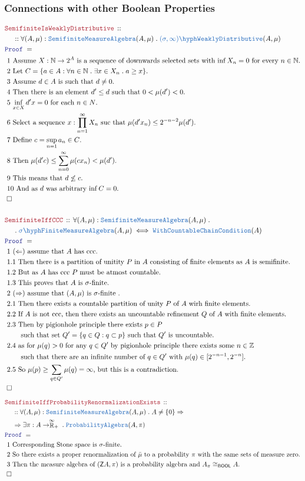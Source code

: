 \documentclass[12pt]{scrartcl}
\newcommand{\TYPE}[1]{\textcolor{NavyBlue}{\mathtt{#1}}}
\newcommand{\LOGIC}[1]{\textcolor{Blue}{\mathtt{#1}}}
\newcommand{\THM}[1]{\textcolor{Maroon}{\mathtt{#1}}}
\renewcommand{\.}{\; . \;}
\newcommand{\Theorem}[2]{& \THM{#1} \, :: \, #2 \\ & \Proof = \\ }
\newcommand{\NewLine}{\\ & \kern 1pc}
\newcommand{\Page}[1]{ \begin{align*} #1 \end{align*}   }
\newcommand{\Imply}{\Rightarrow}
\newcommand{\Int}{\mathbb{Z} }
\newcommand{\Nat}{\mathbb{N} }
\newcommand{\EReals}{\stackrel{\mathclap{\infty}}{\mathbb{R}}}
\newcommand{\QED}{\; \square}
\newcommand{\EndProof}{& \QED \\}
\newcommand{\Proof}{\LOGIC{Proof} \; }
\newcommand{\Explain}[1]{& \text{#1.} \\}
\newcommand{\ExplainFurther}[1]{& \text{#1} \\}
\newcommand{\CCC}{\TYPE{WithCountableChainCondition}}
\newcommand{\WD}{\TYPE{(\sigma,\infty)\hyph WeaklyDistributive}}
\newcommand{\BOOL}{\mathsf{BOOL}}
\newcommand{\Z}{\mathsf{Z}}
\newcommand{\sFinite}{\TYPE{\sigma \hyph  Finite}}
\newcommand{\Semifinite}{\TYPE{Semifinite}}
\newcommand{\MA}{\TYPE{MeasureAlgebra}}
\begin{document}
\subsubsection{Connections with other Boolean Properties}
\Page{
	\Theorem{SemifiniteIsWeaklyDistributive}
	{
		\NewLine ::	
		\forall (A,\mu) : \Semifinite\MA(A,\mu) \. 
		\WD(A,\mu)
	}
	\Explain{ 1 Assume 
		$X : \Nat \to 2^A$ is a sequence of downwards selected sets with 
		$\inf X_n =  0$ for every $n \in \Nat$}
	\Explain{ 2 Let $C = \{ a \in A : \forall n \in \Nat \. \exists  x \in X_n \. a \ge x \}$}
	\Explain{ 3 Assume $d \in A$ is such that $d \neq 0$}
	\Explain{ 4 Then there is an element $d' \le d$ such that $0 < \mu(d') < 0$}
	\Explain{ 5 $\inf_{x \in X} d'x = 0$ for each $n \in N$}
	\Explain{ 6 Select a sequence $x : \prod^\infty_{n=1} X_n$ suc that 
		$\mu(d'x_n) \le 2^{-n-2} \mu(d')$}
	\Explain{ 7 Define $c = \sup_{n=1} a_n \in C$}
	\Explain{ 8 Then $\mu(d'c) \le \sum^\infty_{n=0} \mu(c x_n) < \mu(d')$} 
	\Explain{ 9 This means that $d \not \le c$}
	\Explain{ 10 And as $d$  was arbitrary $\inf C = 0$}
	\EndProof
	\\
	\Theorem{SemifiniteIffCCC}
	{
		\forall (A,\mu ) : \Semifinite\MA(A,\mu) \. \NewLine \.
		\sFinite\MA(A,\mu) \iff \CCC(A)
	}
	\Explain{ 1 $(\Leftarrow)$ assume that $A$ has ccc}
	\Explain{ 1.1 Then there is a partition of unitity $P$ in $A$ consisting of finite elements 
		as $A$ is semifinite}
	\Explain{ 1.2 But as $A$ has ccc $P$ must be atmost countable}
	\Explain{ 1.3 This proves that $A$ is $\sigma$-finite}
	\Explain{ 2 $(\Rightarrow)$ assume that $(A,\mu)$ is $\sigma$-finite }
	\Explain{ 2.1 Then there exists a countable partition of unity $P$ of $A$ 
		wirh finite elements}
	\Explain{ 2.2 If $A$ is not ccc, then there exists an uncountable refinement $Q$ of $A$ 
		with finite elements}
	\ExplainFurther{ 2.3 Then by pigionhole principle there exists $p \in P$}
	\Explain{ \quad \quad such that  set $Q' = \{ q \in Q :  q \subset p \}$ such that $Q'$ is uncountable}
	\ExplainFurther{ 2.4 as for $\mu(q) > 0$ for any $q \in Q'$ 
		by pigionhole principle there exists some $n\in \Int$}
	\Explain{ \quad \quad such that there are an infinite number 
		of $q \in Q'$ with $\mu(q) \in [2^{-n-1},2^{-n}]$}
	\Explain{ 2.5 So $\mu(p) \ge \sum_{q \in Q'} \mu(q) = \infty$, but this is a contradiction}
	\EndProof
}\Page{
	\Theorem{SemifiniteIffProbabilityRenormalizationExists}
	{
		\NewLine ::		
		\forall (A,\mu) : \Semifinite\MA(A,\mu) \. A \neq \{0\} \Imply \NewLine \Imply
		\exists \pi : A \to \EReals_+ \.  \TYPE{ProbabilityAlgebra}(A,\pi)
	}
	\Explain{ 1 Corresponding Stone space is $\sigma$-finite}
	\Explain{ 2 So there exists a proper renormalization of $\bar \mu$ to a probability $\pi$
		with the same sets of measure zero}
	\Explain{ 3 Then the measure algebra of $(\Z A,\pi)$ is a probability algebra and 
		$A_\pi \cong_\BOOL A$}
	\EndProof
}
\newpage
\end{document}
